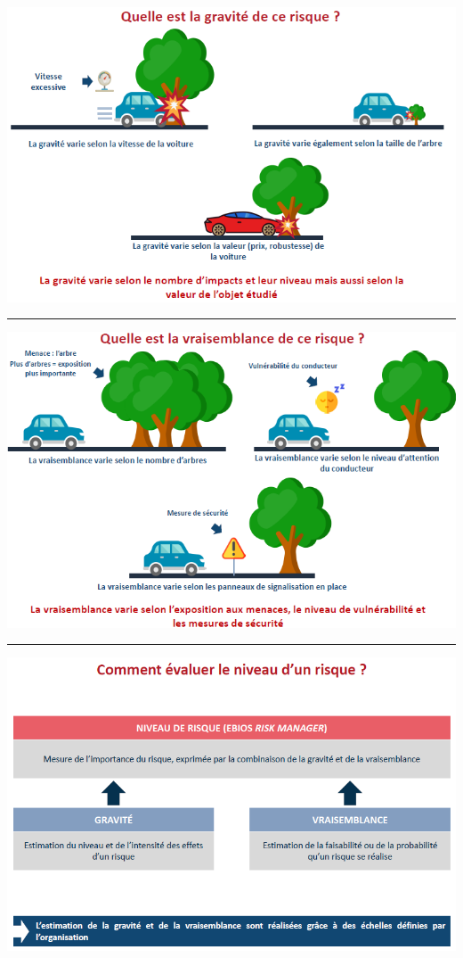 \documentclass[french, 12pt]{article}%
\begin{document}
\begin{center}
\includegraphics[scale=0.7]{./ressource/voiture2}
\end{center}
\begin{center}
 \rule{1.0\linewidth}{1pt}
 \end{center}
\begin{center}
\includegraphics[scale=0.7]{./ressource/voiture3}
\end{center}
\begin{center}
 \rule{1.0\linewidth}{1pt}
 \end{center}
\begin{center}
\includegraphics[scale=0.7]{./ressource/presentationRisqueManager}
\end{center}
\end{document}
